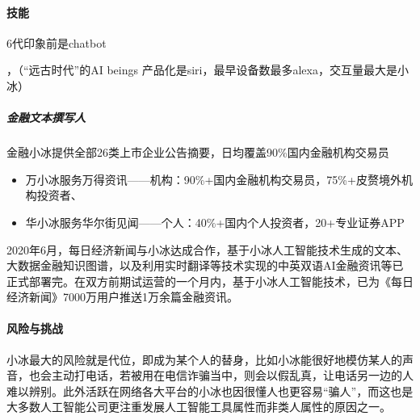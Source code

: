 \documentclass[letterpaper,10pt,english]{sphinxmanual}
\begin{document}
\paragraph{技能}
\label{\detokenize{chapter_AI_company/xiaoice:id21}}
6代印象前是chatbot%
\begin{footnote}[1070]\sphinxAtStartFootnote
{}
%
\end{footnote}，（“远古时代”的AI
beings 产品化是siri，最早设备数最多alexa，交互量最大是小冰）


\subparagraph{金融文本撰写人}
\label{\detokenize{chapter_AI_company/xiaoice:id22}}
金融小冰提供全部26类上市企业公告摘要，日均覆盖90\%国内金融机构交易员
\begin{itemize}
\item {} 
万小冰服务万得资讯——机构：90\%+国内金融机构交易员，75\%+皮赘境外机构投资者、

\item {} 
华小冰服务华尔街见闻——个人：40\%+国内个人投资者，20+专业证券APP

\end{itemize}

2020年6月，每日经济新闻与小冰达成合作，基于小冰人工智能技术生成的文本、大数据金融知识图谱，以及利用实时翻译等技术实现的中英双语AI金融资讯等已正式部署完。在双方前期试运营的一个月内，基于小冰人工智能技术，已为《每日经济新闻》7000万用户推送1万余篇金融资讯。



\paragraph{风险与挑战}
\label{\detokenize{chapter_AI_company/xiaoice:id23}}
小冰最大的风险就是代位，即成为某个人的替身，比如小冰能很好地模仿某人的声音，也会主动打电话，若被用在电信诈骗当中，则会以假乱真，让电话另一边的人难以辨别。此外活跃在网络各大平台的小冰也因很懂人也更容易“骗人”，而这也是大多数人工智能公司更注重发展人工智能工具属性而非类人属性的原因之一。
\end{document}
